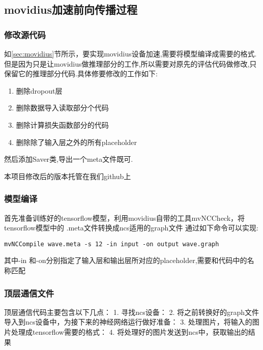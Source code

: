 \subsection{movidius加速前向传播过程}
\subsubsection{修改源代码}

如\ref{sec:movidius}节所示，要实现movidius设备加速,需要将模型编译成需要的格式.
但是因为只是让movidius做推理部分的工作,所以需要对原先的评估代码做修改,只保留它的推理部分代码.具体修要修改的工作如下:
\begin{enumerate}
	\item 删除dropout层
	\item 删除数据导入读取部分个代码
	 \item	删除计算损失函数部分的代码
	 \item	删除除了输入层之外的所有placeholder
\end{enumerate}
然后添加Saver类,导出一个meta文件既可.

本项目修改后的版本托管在我们github\cite{my-fast-neural-sytle-tensorflow}上
\subsubsection{模型编译}
首先准备训练好的tensorflow模型，利用movidius自带的工具mvNCCheck，将tensorflow模型中的 .meta文件转换成ncs适用的graph文件
通过如下命令可以实现:
\begin{lstlisting}
mvNCCompile wave.meta -s 12 -in input -on output wave.graph
\end{lstlisting}
其中-in 和-on分别指定了输入层和输出层所对应的placeholder,需要和代码中的名称匹配
\subsubsection{顶层通信文件}
顶层通信代码主要包含以下几点：
1. 寻找ncs设备：
2. 将之前转换好的graph文件导入到ncs设备中，为接下来的神经网络运行做好准备：
3. 处理图片，将输入的图片处理成tensorflow需要的格式：
4. 将处理好的图片发送到ncs中，获取输出的结果
